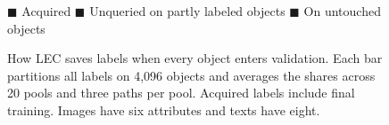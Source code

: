 \begin{figure}[htbp]\centering
\par
{\footnotesize\textcolor{paperblue}{$\blacksquare$} Acquired\qquad
 \textcolor{papersage}{$\blacksquare$} Unqueried on partly labeled objects\qquad
 \textcolor{paperclay}{$\blacksquare$} On untouched objects}
\caption{How LEC saves labels when every object enters validation. Each bar partitions all labels on 4,096 objects and averages the shares across 20 pools and three paths per pool. Acquired labels include final training. Images have six attributes and texts have eight.}
\label{fig:full_validation}
\end{figure}
